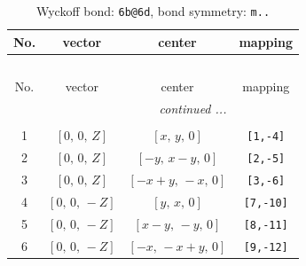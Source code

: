 \documentclass[fleqn,8pt]{jsarticle}
\begin{document}
\begin{longtable}{cccc}
\caption{Wyckoff bond: {\tt 6b@6d}, bond symmetry: {\tt m..}}
 \\
 \hline \hline
No. & vector & center & mapping \\ \hline \endfirsthead

\multicolumn{3}{l}{\tablename\ \thetable{}} \\
 \hline \hline
No. & vector & center & mapping \\ \hline \endhead

 \hline \hline
\multicolumn{3}{r}{\footnotesize\it continued ...} \\ \endfoot

 \hline \hline
\multicolumn{3}{r}{} \\ \endlastfoot

1 & $\left[ 0,\, 0,\, Z \right]$ & $\left[ x,\, y,\, 0 \right]$ & {\tt [1,-4]} \\ \hline
2 & $\left[ 0,\, 0,\, Z \right]$ & $\left[ - y,\, x - y,\, 0 \right]$ & {\tt [2,-5]} \\ \hline
3 & $\left[ 0,\, 0,\, Z \right]$ & $\left[ - x + y,\, - x,\, 0 \right]$ & {\tt [3,-6]} \\ \hline
4 & $\left[ 0,\, 0,\, - Z \right]$ & $\left[ y,\, x,\, 0 \right]$ & {\tt [7,-10]} \\ \hline
5 & $\left[ 0,\, 0,\, - Z \right]$ & $\left[ x - y,\, - y,\, 0 \right]$ & {\tt [8,-11]} \\ \hline
6 & $\left[ 0,\, 0,\, - Z \right]$ & $\left[ - x,\, - x + y,\, 0 \right]$ & {\tt [9,-12]} \\
\end{longtable}
\renewcommand{\arraystretch}{1.2}
\end{document}
